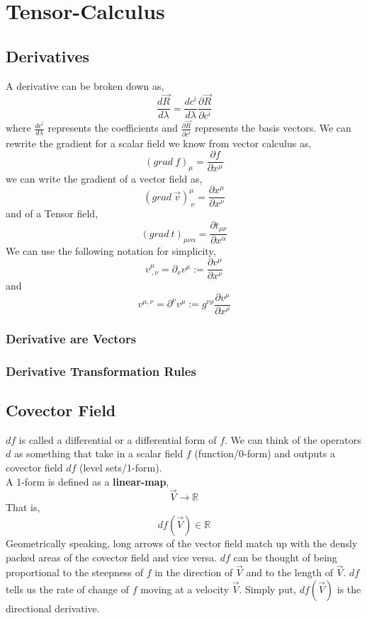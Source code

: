 \chapter{Tensor-Calculus}
\section{Derivatives}
A derivative can be broken down as,
\begin{equation}
\frac{d \vec{R}}{d \lambda} = \frac{d c^{i}}{d \lambda} \frac{\partial \vec{R}}{\partial c^{i}}
\end{equation}
where $\frac{d c^{i}}{d \lambda}$ represents the coefficients and $\frac{\partial \vec{R}}{\partial c^{i}}$ represents the basis vectors.
We can rewrite the gradient for a scalar field we know from vector calculus as, 
\begin{equation}
{(grad \ f)}_{\mu} = \frac{\partial f}{\partial x^{\mu}}
\end{equation}
we can write the gradient of a vector field as,
\begin{equation}
{(grad \ \vec{v})}^{\mu}_{\  \nu} = \frac{\partial x^{\mu}}{\partial x^{\nu}}
\end{equation}
and of a Tensor field,
\begin{equation}
{(grad \ t)}_{\mu \nu \alpha} = \frac{\partial t_{\mu \nu}}{\partial x^{\alpha}}
\end{equation}
We can use the following notation for simplicity,
\begin{equation}
v^{\mu}_{ \ ,\nu} = \partial_{\nu} v^{\mu} := \frac{\partial v^{\mu}}{\partial x^{\nu}}
\end{equation}
and 
\begin{equation}
v^{\mu,\nu} = \partial^{\nu} v^{\mu} := g^{\nu \rho} \frac{\partial v^{\mu}}{\partial x^{\rho}}
\end{equation}
\subsection{Derivative are Vectors}
\subsection{Derivative Transformation Rules}
\section{Covector Field}
$df$ is called a differential or a differential form of $f$. We can think of the operators $d$ as something that take in a scalar field $f$ (function/0-form) and outputs a covector field $df$ (level sets/1-form). \\
A 1-form is defined as a \textbf{linear-map},
$$\vec{V} \rightarrow \mathbb{R}$$
That is,
$$df(\vec{V}) \in \mathbb{R}$$
Geometrically speaking, long arrows of the vector field match up with the densly packed areas of the covector field and vice versa. $df$ can be thought of being proportional to the steepness of $f$ in the direction of $\vec{V}$ and to the length of $\vec{V}$. $df$ tells us the rate of change of $f$ moving at a velocity $\vec{V}$. Simply put, $df(\vec{V})$ is the directional derivative.
